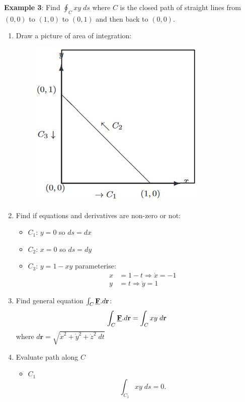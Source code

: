 \documentclass[10pt,a4paper]{article}
\begin{document}
\textbf{Example 3}: Find $\oint_C xy\; ds$ where $C$ is the closed path of straight lines from $(0,0)$ to
$(1,0)$ to $(0,1)$ and then back to $(0,0)$.
\begin{enumerate}
    \item Draw a picture of area of integration:
    \begin{figure} [h!]
        \centering
        \includegraphics[scale=0.8]{Ps1.JPG}
    \end{figure}
    \item Find if equations and derivatives are non-zero or not: 
    \begin{itemize}
        \item $C_1$: $y=0$ so $ds=dx$ 
        \item $C_2$: $x=0$ so $ds=dy$ 
        \item $C_3$: $y= 1-xy$ parameterise:
        \begin{align*}
            x &= 1-t \Rightarrow \dot{x} = -1 \\
            y &= t \Rightarrow \dot{y} = 1
        \end{align*}
    \end{itemize}
    \item Find general equation $\int_{C}\textbf{\underline{F}}.d \textbf{r}$:
    \begin{align*}
        \int_{C}\textbf{\underline{F}}.d \textbf{r} = \int_C xy \; d\textbf{r}
    \end{align*}
    where $d\textbf{r} = \sqrt{\dot{x}^2 + \dot{y}^2 + \dot{z}^2 \; dt}$
    \item Evaluate path along $C$
    \begin{itemize}
        \item $C_1$
        $$
        \int_{C_1}xy \; ds= 0.
        $$

\end{itemize}
\end{enumerate}
\end{document}
